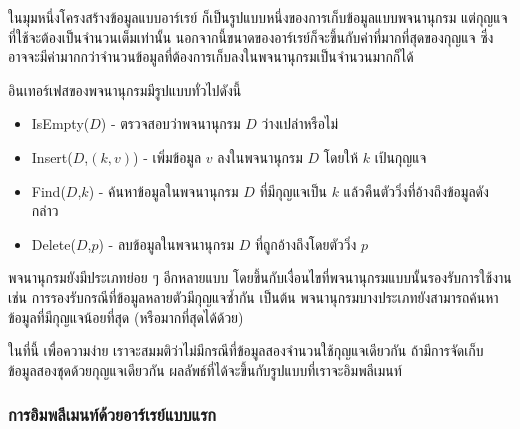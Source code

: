 ใน{\wbr}มุม{\wbr}หนึ่ง{\wbr}โครงสร้าง{\wbr}ข้อมูล{\wbr}แบบ{\wbr}อาร์เรย์ ก็{\wbr}เป็น{\wbr}รูปแบบ{\wbr}หนึ่ง{\wbr}ของ{\wbr}การ{\wbr}เก็บ{\wbr}ข้อมูล{\wbr}แบบ{\wbr}พจนานุกรม{\wbr}
แต่{\wbr}กุญแจ{\wbr}ที่{\wbr}ใช้{\wbr}จะ{\wbr}ต้อง{\wbr}เป็น{\wbr}จำนวนเต็ม{\wbr}เท่านั้น{\wbr}
นอกจากนี้{\wbr}ขนาด{\wbr}ของ{\wbr}อาร์เรย์{\wbr}ก็{\wbr}จะ{\wbr}ขึ้น{\wbr}กับ{\wbr}ค่า{\wbr}ที่{\wbr}มาก{\wbr}ที่สุด{\wbr}ของ{\wbr}กุญแจ{\wbr}
ซึ่ง{\wbr}อาจ{\wbr}จะ{\wbr}มี{\wbr}ค่า{\wbr}มาก{\wbr}กว่า{\wbr}จำนวน{\wbr}ข้อมูล{\wbr}ที่{\wbr}ต้องการ{\wbr}เก็บ{\wbr}ลง{\wbr}ใน{\wbr}พจนานุกรม{\wbr}เป็น{\wbr}จำนวน{\wbr}มาก{\wbr}ก็ได้{\wbr}

อิน{\wbr}เทอร์เฟส{\wbr}ของ{\wbr}พจนานุกรม{\wbr}มี{\wbr}รูปแบบ{\wbr}ทั่วไป{\wbr}ดังนี้{\wbr}
\begin{itemize}
\item IsEmpty($D$) - ตรวจสอบ{\wbr}ว่า{\wbr}พจนานุกรม $D$ ว่างเปล่า{\wbr}หรือ{\wbr}ไม่{\wbr}
\item Insert($D$,$(k,v)$) - เพิ่ม{\wbr}ข้อมูล $v$ ลง{\wbr}ใน{\wbr}พจนานุกรม $D$ โดย{\wbr}ให้ $k$ เป้{\wbr}น{\wbr}กุญแจ{\wbr}
\item Find($D$,$k$) - ค้นหา{\wbr}ข้อมูล{\wbr}ใน{\wbr}พจนานุกรม $D$ ที่{\wbr}มี{\wbr}กุญแจ{\wbr}เป็น $k$
  แล้ว{\wbr}คืนตัว{\wbr}วิ่ง{\wbr}ที่{\wbr}อ้าง{\wbr}ถึง{\wbr}ข้อมูล{\wbr}ดังกล่าว{\wbr}
\item Delete($D$,$p$) - ลบ{\wbr}ข้อมูล{\wbr}ใน{\wbr}พจนานุกรม $D$ ที่{\wbr}ถูก{\wbr}อ้าง{\wbr}ถึง{\wbr}โดย{\wbr}ตัว{\wbr}วิ่ง $p$
\end{itemize}

พจนานุกรม{\wbr}ยัง{\wbr}มี{\wbr}ประเภท{\wbr}ย่อย ๆ อีก{\wbr}หลาย{\wbr}แบบ{\wbr}
โดย{\wbr}ขึ้น{\wbr}กับ{\wbr}เงื่อนไข{\wbr}ที่{\wbr}พจนานุกรม{\wbr}แบบ{\wbr}นั้น{\wbr}รองรับ{\wbr}การ{\wbr}ใช้{\wbr}งาน เช่น{\wbr}
การ{\wbr}รองรับ{\wbr}กรณี{\wbr}ที่{\wbr}ข้อมูล{\wbr}หลาย{\wbr}ตัว{\wbr}มี{\wbr}กุญแจ{\wbr}ซ้ำ{\wbr}กัน เป็นต้น{\wbr}
พจนานุกรม{\wbr}บาง{\wbr}ประเภท{\wbr}ยัง{\wbr}สามารถ{\wbr}ค้นหา{\wbr}ข้อมูล{\wbr}ที่{\wbr}มี{\wbr}กุญแจ{\wbr}น้อย{\wbr}ที่สุด (หรือ{\wbr}มาก{\wbr}ที่สุด{\wbr}ได้{\wbr}ด้วย)

ใน{\wbr}ที่นี้ เพื่อ{\wbr}ความ{\wbr}ง่าย เรา{\wbr}จะ{\wbr}สมมติ{\wbr}ว่า{\wbr}ไม่{\wbr}มี{\wbr}กรณี{\wbr}ที่{\wbr}ข้อมูล{\wbr}สอง{\wbr}จำนวน{\wbr}ใช้{\wbr}กุญแจ{\wbr}เดียวกัน{\wbr}
ถ้า{\wbr}มี{\wbr}การ{\wbr}จัด{\wbr}เก็บ{\wbr}ข้อมูล{\wbr}สอง{\wbr}ชุด{\wbr}ด้วย{\wbr}กุญแจ{\wbr}เดียวกัน ผลลัพธ์{\wbr}ที่{\wbr}ได้{\wbr}จะ{\wbr}ขึ้น{\wbr}กับ{\wbr}รูปแบบ{\wbr}ที่{\wbr}เรา{\wbr}จะ{\wbr}อิม{\wbr}พลี{\wbr}เมนท์

\subsubsection{การ{\wbr}อิม{\wbr}พลี{\wbr}เมนท์{\wbr}ด้วย{\wbr}อาร์เรย์{\wbr}แบบ{\wbr}แรก}

